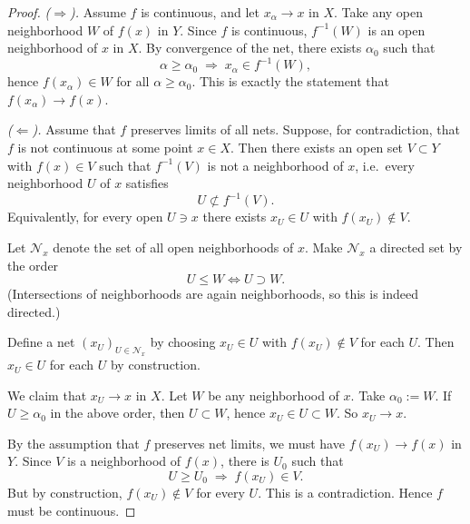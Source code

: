 \documentclass[12pt]{article}
\renewcommand{\(}{\left(}%
\renewcommand{\)}{\right)}%
\renewcommand{\[}{\left[}%
\renewcommand{\]}{\right]}%
\newtheorem{proof}{Proof.}}
\begin{document}
\begin{proof}
	\emph{($\Rightarrow$).}  
Assume $f$ is continuous, and let $x_\alpha\to x$ in $X$.  
Take any open neighborhood $W$ of $f(x)$ in $Y$. Since $f$ is continuous, $f^{-1}(W)$ is an open neighborhood of $x$ in $X$.  
By convergence of the net, there exists $\alpha_0$ such that
\begin{equation*}
\alpha \ge \alpha_0 \;\Rightarrow\; x_\alpha \in f^{-1}(W),
\end{equation*}
hence $f(x_\alpha)\in W$ for all $\alpha\ge\alpha_0$.  
This is exactly the statement that $f(x_\alpha)\to f(x)$.

\medskip

\emph{($\Leftarrow$).}  
Assume that $f$ preserves limits of all nets. Suppose, for contradiction, that $f$ is not continuous at some point $x\in X$. Then there exists an open set $V\subset Y$ with $f(x)\in V$ such that $f^{-1}(V)$ is not a neighborhood of $x$, i.e.\ every neighborhood $U$ of $x$ satisfies
\begin{equation*}
U\not\subset f^{-1}(V).
\end{equation*}
Equivalently, for every open $U\ni x$ there exists $x_U\in U$ with $f(x_U)\notin V$. 

Let $\mathcal{N}_x$ denote the set of all open neighborhoods of $x$. Make $\mathcal{N}_x$ a directed set by the order
\begin{equation*}
U\le W \iff U\supset W.
\end{equation*}
(Intersections of neighborhoods are again neighborhoods, so this is indeed directed.)

Define a net $(x_U)_{U\in\mathcal{N}_x}$ by choosing $x_U\in U$ with $f(x_U)\notin V$ for each $U$. Then $x_U\in U$ for each $U$ by construction.

We claim that $x_U\to x$ in $X$.  
Let $W$ be any neighborhood of $x$. Take $\alpha_0:=W$. If $U\ge\alpha_0$ in the above order, then $U\subset W$, hence $x_U\in U\subset W$.  
So $x_U\to x$.

By the assumption that $f$ preserves net limits, we must have $f(x_U)\to f(x)$ in $Y$. Since $V$ is a neighborhood of $f(x)$, there is $U_0$ such that
\begin{equation*}
U\ge U_0 \;\Rightarrow\; f(x_U)\in V.
\end{equation*}
But by construction, $f(x_U)\notin V$ for every $U$. This is a contradiction.  
Hence $f$ must be continuous.
\end{proof}
\end{document}
